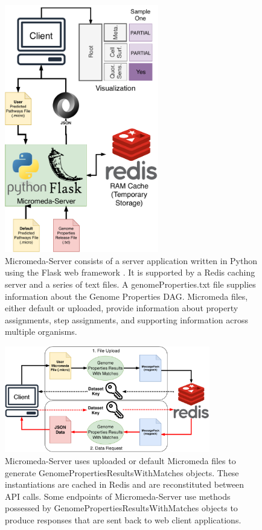 \begin{figure}[!ht]
  \centering
	\includegraphics[width=0.60\textwidth]{media/Micromeda-Server.pdf}
	 \caption{Micromeda-Server consists of a server application written in Python using the Flask web framework \cite{grinberg2018flask}. It is supported by a Redis caching server and a series of text files. A genomeProperties.txt file supplies information about the Genome Properties DAG. Micromeda files, either default or uploaded, provide information about property assignments, step assignments, and supporting information across multiple organisms.}
	 \label{fig:micromeda-server}
\end{figure}

\begin{figure}[!ht]
  \centering
	\includegraphics[width=0.80\textwidth]{media/Micromeda-Server-Workflow.pdf}
	 \caption{Micromeda-Server uses uploaded or default Micromeda files to generate GenomePropertiesResultsWithMatches objects. These instantiations are cached in Redis and are reconstituted between API calls. Some endpoints of Micromeda-Server use methods possessed by GenomePropertiesResultsWithMatches objects to produce responses that are sent back to web client applications.}
	 \label{fig:micromeda-server-workflow}
\end{figure}

